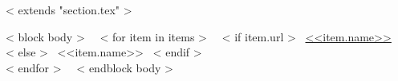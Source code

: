 ~< extends "section.tex" >~

~< block body >~
  ~< for item in items >~
    ~< if item.url >~
      \href{<<item.url>>}{\color{links}<<item.name>>}
    ~< else >~
      <<item.name>>
    ~< endif >~
  \\
  ~< endfor >~
\vspace{-.15in}
~< endblock body >~
